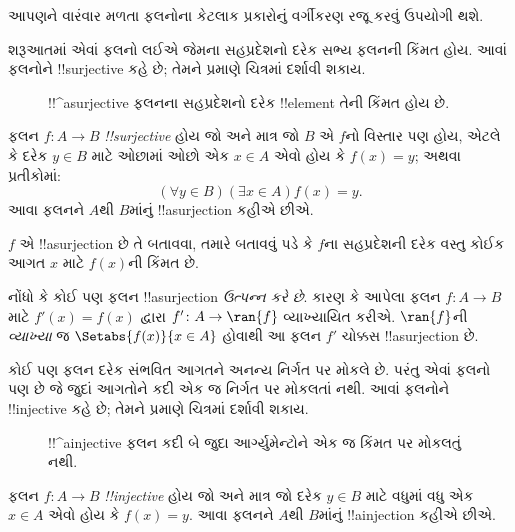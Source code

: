 \documentclass[../../../include/open-logic-section]{subfiles}
\begin{document}

\begin{explain}
આપણને વારંવાર મળતા ફલનોના કેટલાક પ્રકારોનું
વર્ગીકરણ રજૂ કરવું ઉપયોગી થશે.

શરૂઆતમાં એવાં ફલનો લઈએ જેમના સહપ્રદેશનો દરેક સભ્ય
ફલનની કિંમત હોય. આવાં ફલનોને !!{surjective} કહે છે;
તેમને  પ્રમાણે ચિત્રમાં દર્શાવી શકાય.

\begin{figure}
  \caption{!!^a{surjective} ફલનના સહપ્રદેશનો દરેક
    !!{element} તેની કિંમત હોય છે.}
\end{figure}
\end{explain}

\begin{defn}
ફલન $f \colon A \rightarrow B$ \emph{!!{surjective}}
હોય જો અને માત્ર જો $B$ એ $f$નો વિસ્તાર પણ હોય, એટલે કે
દરેક $y \in B$ માટે ઓછામાં ઓછો એક $x \in A$
એવો હોય કે $f(x) = y$; અથવા પ્રતીકોમાં:
\[
  (\forall y \in B)(\exists x \in A)f(x) = y.
\]
આવા ફલનને $A$થી $B$માંનું !!a{surjection} કહીએ છીએ.
\end{defn}

\begin{explain}
$f$ એ !!a{surjection} છે તે બતાવવા, તમારે બતાવવું પડે
કે $f$ના સહપ્રદેશની દરેક વસ્તુ કોઈક આગત $x$ માટે
$f(x)$ની કિંમત છે.

નોંધો કે કોઈ પણ ફલન !!a{surjection}
\emph{ઉત્પન્ન કરે છે}. કારણ કે આપેલા ફલન
$f \colon A \to B$ માટે $f'(x) = f(x)$ દ્વારા
$f' \colon A \to \ran{f}$ વ્યાખ્યાયિત કરીએ.
$\ran{f}$ની \emph{વ્યાખ્યા} જ
$\Setabs{f(x)}{x \in A}$ હોવાથી આ ફલન
$f'$ ચોક્કસ !!a{surjection} છે.
\end{explain}

\begin{explain}
કોઈ પણ ફલન દરેક સંભવિત આગતને અનન્ય નિર્ગત પર મોકલે છે.
પરંતુ એવાં ફલનો પણ છે જે જુદાં આગતોને કદી એક જ
નિર્ગત પર મોકલતાં નથી. આવાં ફલનોને !!{injective}
કહે છે; તેમને  પ્રમાણે ચિત્રમાં
દર્શાવી શકાય.
\begin{figure}
  \caption{!!^a{injective} ફલન કદી બે જુદા આર્ગ્યુમેન્ટોને
    એક જ કિંમત પર મોકલતું નથી.}
\end{figure}
\end{explain}

\begin{defn}
ફલન $f \colon A \rightarrow B$ \emph{!!{injective}}
હોય જો અને માત્ર જો દરેક $y \in B$ માટે વધુમાં વધુ
એક $x \in A$ એવો હોય કે $f(x) = y$.
આવા ફલનને $A$થી $B$માંનું !!a{injection} કહીએ છીએ.
\end{defn}
\end{document}
